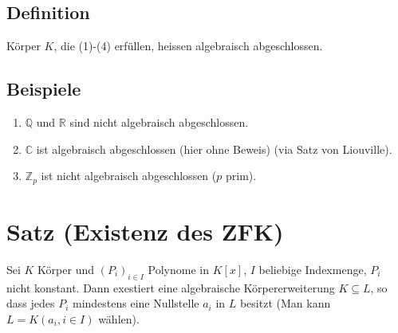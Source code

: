 \documentclass[12pt,a4paper,ngerman]{scrreprt}
\begin{document}
\subsection{Definition}
Körper $K$, die (1)-(4) erfüllen, heissen algebraisch abgeschlossen.

\subsection{Beispiele}
\begin{enumerate}[(1)]
\item $\mathbb{Q}$ und $\mathbb{R}$ sind nicht algebraisch abgeschlossen.
\item $\mathbb{C}$ ist algebraisch abgeschlossen (hier ohne Beweis) (via Satz von Liouville).
\item $\mathbb{Z}_p$ ist nicht algebraisch abgeschlossen ($p$ prim).
\end{enumerate}


\section{Satz (Existenz des ZFK)}
Sei $K$ Körper und $(P_i)_{i \in I}$ Polynome in $K[x]$, $I$ beliebige Indexmenge, $P_i$ nicht konstant.
Dann exestiert eine algebraische Körpererweiterung $K \subseteq L$, 
so dass jedes $P_i$ mindestens eine Nullstelle $a_i$ in $L$ besitzt
(Man kann $L=K(a_i, i \in I)$ wählen).
\end{document}
